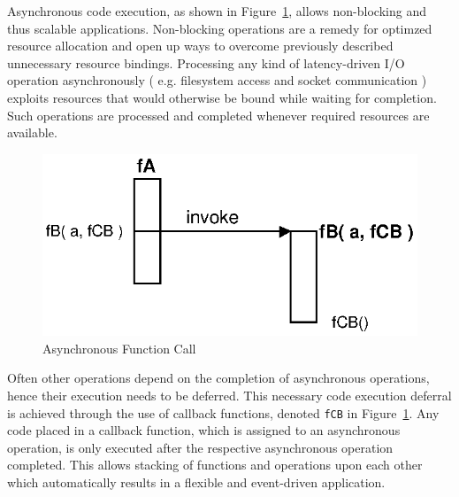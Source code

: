 Asynchronous code execution, as shown in Figure~\ref{fig:Closures_Asynchronous}, allows non-blocking and thus scalable applications.
Non-blocking operations are a remedy for optimzed resource allocation and open up ways to overcome previously described unnecessary resource bindings.
Processing any kind of latency-driven I/O operation asynchronously ( e.g. filesystem access and socket communication ) exploits resources that would otherwise be bound while waiting for completion.
Such operations are processed and completed whenever required resources are available.
\begin{figure}[!ht]
	\centering
  \includegraphics{figures/Closures_Asynchronous}
	\caption{Asynchronous Function Call}
	\label{fig:Closures_Asynchronous}
\end{figure}

Often other operations depend on the completion of asynchronous operations, hence their execution needs to be deferred.
This necessary code execution deferral is achieved through the use of callback functions, denoted \texttt{fCB} in Figure~\ref{fig:Closures_Asynchronous}.
Any code placed in a callback function, which is assigned to an asynchronous operation, is only executed after the respective asynchronous operation completed.
This allows stacking of functions and operations upon each other which automatically results in a flexible and event-driven application.

